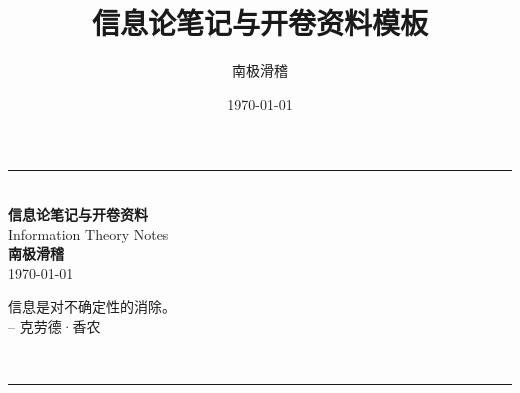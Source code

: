 \documentclass{notes}
\title{信息论笔记与开卷资料模板}
\author{南极滑稽}
\date{\today}
\begin{document}
\begin{titlepage}
  \centering
  \vspace*{2.2cm}

  {\color{MidnightBlue}\rule{0.78\textwidth}{1.2pt}}\\[1.2cm]

  {\fontsize{30}{36}\bfseries\selectfont 信息论笔记与开卷资料}\\[0.5cm]
  {\fontsize{18}{22}\selectfont Information Theory Notes}\\[1.8cm]

  {\Large\textbf{南极滑稽}}\\[0.5cm]
  {\large \today}\\[1.6cm]

  \begin{minipage}{0.78\textwidth}
    \centering
    \setlength{\fboxsep}{8pt}
    \colorbox{MidnightBlue!5}{%
      \parbox{0.88\linewidth}{
        \centering
        信息是对不确定性的消除。\\
        -- 克劳德·香农
      }
    }
  \end{minipage}\\[1.8cm]

  {\color{MidnightBlue}\rule{0.78\textwidth}{1.2pt}}

  \vfill
\end{titlepage}

\tableofcontents

\newpage



















\appendix



\end{document}
